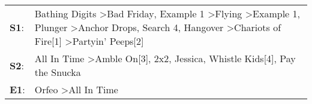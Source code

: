 \begin{supertabular}{p{0.03\textwidth}p{0.92\textwidth}}
 \textbf{S1}:  &  Bathing Digits\textsuperscript{} \textgreater \enspace Bad Friday\textsuperscript{}, \enspace Example 1\textsuperscript{} \textgreater \enspace Flying\textsuperscript{} \textgreater \enspace Example 1\textsuperscript{}, \enspace Plunger\textsuperscript{} \textgreater \enspace Anchor Drops\textsuperscript{}, \enspace Search 4\textsuperscript{}, \enspace Hangover\textsuperscript{} \textgreater \enspace Chariots of Fire[1]\textsuperscript{} \textgreater \enspace Partyin' Peeps[2]\textsuperscript{}  \enspace  \\
 \textbf{S2}:  &                                                                                                                                                                                                                                                                         All In Time\textsuperscript{} \textgreater \enspace Amble On[3]\textsuperscript{}, \enspace 2x2\textsuperscript{}, \enspace Jessica\textsuperscript{}, \enspace Whistle Kids[4]\textsuperscript{}, \enspace Pay the Snucka\textsuperscript{}  \enspace  \\
 \textbf{E1}:  &                                                                                                                                                                                                                                                                                                                                                                                                                                          Orfeo\textsuperscript{} \textgreater \enspace All In Time\textsuperscript{}  \enspace  \\
\end{supertabular}
